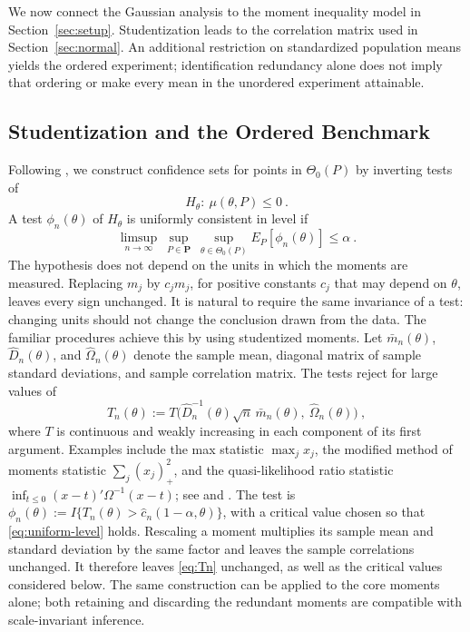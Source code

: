 \documentclass[11pt]{article}
\newcommand{\red}[1]{{\color{red}#1}} %
\numberwithin{equation}{section}
\theoremstyle{definition}
\begin{document}
We now connect the Gaussian analysis to the moment inequality model in Section~\ref{sec:setup}. Studentization leads to the correlation matrix used in Section~\ref{sec:normal}. An additional restriction on standardized population means yields the ordered experiment; identification redundancy alone does not imply that ordering or make every mean in the \red{unordered} experiment attainable.

\subsection{Studentization and the Ordered Benchmark}


Following \citet{canay/shaikh:2017}, we construct confidence sets for points in $\Theta_0(P)$ by inverting tests of
\[
H_\theta:\ \mu(\theta,P)\le0~.
\]
A test $\phi_n(\theta)$ of $H_\theta$ is uniformly consistent in level if
\begin{equation}\label{eq:uniform-level}
\limsup_{n\to\infty}\ \sup_{P\in\mathbf P}\ \sup_{\theta\in\Theta_0(P)}E_P[\phi_n(\theta)]\le\alpha~.
\end{equation}
The hypothesis does not depend on the units in which the moments are measured. Replacing $m_j$ by $c_jm_j$, for positive constants $c_j$ that may depend on $\theta$, leaves every sign unchanged. It is natural to require the same invariance of a test: changing units should not change the conclusion drawn from the data. The familiar procedures achieve this by using studentized moments. Let $\bar m_n(\theta)$, $\hat D_n(\theta)$, and $\hat\Omega_n(\theta)$ denote the sample mean, diagonal matrix of sample standard deviations, and sample correlation matrix. The tests reject for large values of
\begin{equation}\label{eq:Tn}
T_n(\theta):=T\big(\hat D_n^{-1}(\theta)\sqrt n\,\bar m_n(\theta),\ \hat\Omega_n(\theta)\big)~,
\end{equation}
where $T$ is continuous and weakly increasing in each component of its first argument. Examples include the max statistic $\max_jx_j$, the modified method of moments statistic $\sum_j(x_j)_+^2$, and the quasi-likelihood ratio statistic $\inf_{t\le0}(x-t)'\Omega^{-1}(x-t)$; see \citet{canay/shaikh:2017} and \citet{canay/illanes/velez:26}. The test is $\phi_n(\theta):=I\{T_n(\theta)>\hat c_n(1-\alpha,\theta)\}$, with a critical value chosen so that \eqref{eq:uniform-level} holds. Rescaling a moment multiplies its sample mean and standard deviation by the same factor and leaves the sample correlations unchanged. It therefore leaves \eqref{eq:Tn} unchanged, as well as the critical values considered below. The same construction can be applied to the core moments alone; both retaining and discarding the redundant moments are compatible with scale-invariant inference.
\end{document}
